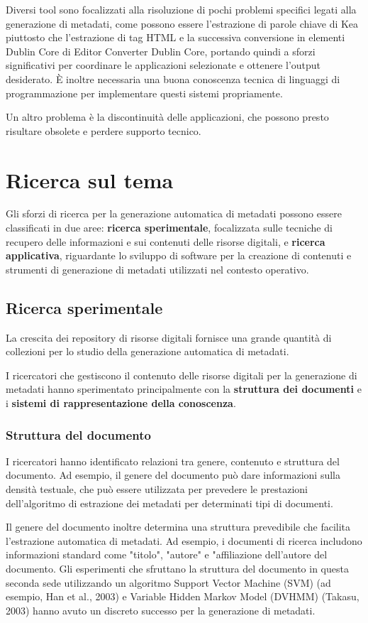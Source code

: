 Diversi tool sono focalizzati alla risoluzione di pochi problemi specifici legati alla generazione di metadati, come possono essere l'estrazione di parole chiave di Kea piuttosto che l'estrazione di tag HTML e la successiva conversione in elementi Dublin Core di Editor Converter Dublin Core, portando quindi a sforzi significativi per coordinare le applicazioni selezionate e ottenere l'output desiderato.
È inoltre necessaria una buona conoscenza tecnica di linguaggi di programmazione per implementare questi sistemi propriamente.

Un altro problema è la discontinuità delle applicazioni, che possono presto risultare obsolete e perdere supporto tecnico.

\section{Ricerca sul tema}
Gli sforzi di ricerca per la generazione automatica di metadati possono essere classificati in due aree: \textbf{ricerca sperimentale}, focalizzata sulle tecniche di recupero delle informazioni e sui contenuti delle risorse digitali, e \textbf{ricerca applicativa}, riguardante lo sviluppo di software per la creazione di contenuti e strumenti di generazione di metadati utilizzati nel contesto operativo\cite{amega}.

\subsection{Ricerca sperimentale}
La crescita dei repository di risorse digitali fornisce una grande quantità di collezioni per lo studio della generazione automatica di metadati.

I ricercatori che gestiscono il contenuto delle risorse digitali per la generazione di metadati hanno sperimentato principalmente con la \textbf{struttura dei documenti} e i \textbf{sistemi di rappresentazione della conoscenza}.

\subsubsection{Struttura del documento}
I ricercatori hanno identificato relazioni tra genere, contenuto e struttura del documento. Ad esempio, il genere del documento può dare informazioni sulla densità testuale, che può essere utilizzata per prevedere le prestazioni dell'algoritmo di estrazione dei metadati per determinati tipi di documenti.

Il genere del documento inoltre determina una struttura prevedibile che facilita l'estrazione automatica di metadati. Ad esempio, i documenti di ricerca includono informazioni standard come "titolo", "autore" e "affiliazione dell'autore del documento. Gli esperimenti che sfruttano la struttura del documento in questa seconda sede utilizzando un algoritmo Support Vector Machine (SVM) (ad esempio, Han et al., 2003) e Variable Hidden Markov Model (DVHMM) (Takasu, 2003) hanno avuto un discreto successo per la generazione di metadati.

